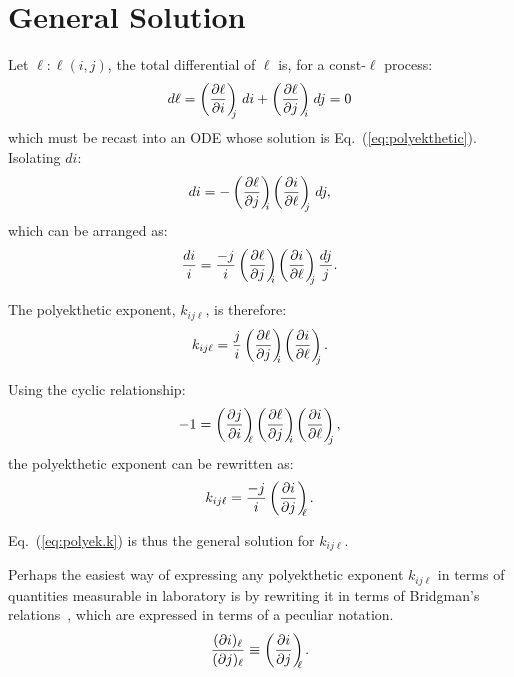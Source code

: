 \section{General Solution}

    Let $\ell:\ell(i, j)$, the total differential of $\ell$ is, for a const-$\ell$ process:
    \begin{equation}
        d\ell = \left(\frac{\partial {{\ell}}}{\partial {{i}}}\right)_{\!\!\!{j}}\,di + \left(\frac{\partial {{\ell}}}{\partial {{j}}}\right)_{\!\!\!{i}}\,dj = 0
        \label{eq:polyek.dl}
    \end{equation}
    \noindent which must be recast into an ODE whose  solution  is  Eq.~(\ref{eq:polyekthetic}).
    Isolating $di$:
    \begin{equation}
        di = -\left(\frac{\partial {{\ell}}}{\partial {{j}}}\right)_{\!\!\!{i}} \left(\frac{\partial {{i}}}{\partial {{\ell}}}\right)_{\!\!\!{j}}\,dj,
        \label{eq:polyek.di}
    \end{equation}
    \noindent which can be arranged as:
    \begin{equation}
        \frac{di}{i} = \frac{-j}{i} \left(\frac{\partial {{\ell}}}{\partial {{j}}}\right)_{\!\!\!{i}} \left(\frac{\partial {{i}}}{\partial {{\ell}}}\right)_{\!\!\!{j}} \frac{dj}{j}.
        \label{eq:polyek.ode}
    \end{equation}

    The polyekthetic exponent, $k_{ij\ell}$, is therefore:
    \begin{equation}
        k_{ij\ell} = \frac{j}{i} \left(\frac{\partial {{\ell}}}{\partial {{j}}}\right)_{\!\!\!{i}} \left(\frac{\partial {{i}}}{\partial {{\ell}}}\right)_{\!\!\!{j}}.
        \label{eq:polyek.k.raw}
    \end{equation}

    Using the cyclic relationship:
    \begin{equation}
        -1 = \parxyz ji\ell \parxyz\ell ji \parxyz i\ell j,
        \label{eq:cyclic}
    \end{equation}
    \noindent the polyekthetic exponent can be rewritten as:
    \begin{equation}
        k_{ij\ell} = \frac{-j}{i} \left(\frac{\partial {{i}}}{\partial {{j}}}\right)_{\!\!\!{\ell}}.
        \label{eq:polyek.k}
    \end{equation}

    Eq.~(\ref{eq:polyek.k}) is thus the general solution for $k_{ij\ell}$.

    Perhaps the easiest way of expressing any polyekthetic exponent  $k_{ij\ell}$  in  terms  of
    quantities  measurable  in  laboratory  is  by  rewriting  it   in   terms   of   Bridgman's
    relations~\cite{2006-BejanA-Wiley}, which are expressed in terms of a peculiar notation.
    \begin{equation}
        \frac{(\partial {{i}})_{{\ell}}}{(\partial {{j}})_{{\ell}}} \equiv \left(\frac{\partial {{i}}}{\partial {{j}}}\right)_{\!\!\!{\ell}}.
        \label{eq:Bridgman}
    \end{equation}

